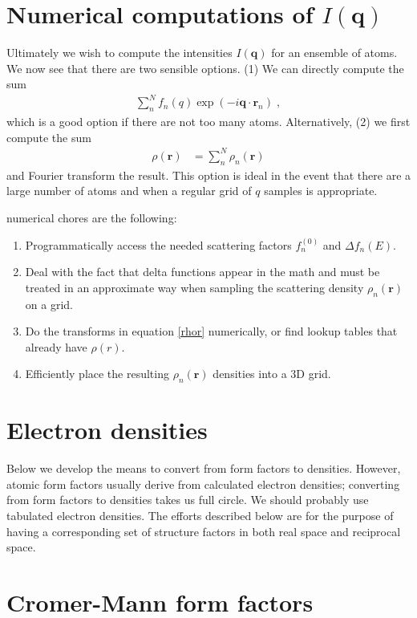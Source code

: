 \documentclass[11pt]{article}
\renewcommand{\vec}[1]{\boldsymbol{#1}}
\begin{document}
\section{Numerical computations of $I(\vec{q})$}

Ultimately we wish to compute the intensities $I(\vec{q})$ for an ensemble of atoms.  We now see that there are two 
sensible options.  (1) We can directly compute the sum
\begin{align}
 \sum_n^N f_n(q) \exp(-i \vec{q}\cdot\vec{r}_n) \;,
\end{align}
which is a good option if there are not too many atoms.  Alternatively, (2) we first compute the sum
\begin{align}
\rho(\vec{r})  &= \sum_n^N \rho_n(\vec{r})
\end{align}
and Fourier transform the result.  This option is ideal in the event that there are a large number of atoms and
when a regular grid of $q$ samples is appropriate.  

numerical chores are the following:
\begin{enumerate}
\item Programmatically access the needed scattering factors $f_n^{(0)}$ and $\Delta f_n(E)$.
\item Deal with the fact that delta functions appear in the math and must be treated in an approximate way when 
sampling the scattering density $\rho_n(\vec{r})$ on a grid.
\item Do the transforms in equation \ref{rhor} numerically, or find lookup tables that already have $\rho(r)$.
\item Efficiently place the resulting $\rho_n(\vec{r})$ densities into a 3D grid.
\end{enumerate}

\section{Electron densities}

Below we develop the means to convert from form factors to densities.  However, atomic form factors usually derive from
calculated electron densities; converting from form factors to densities takes us full circle.  We should probably use
tabulated electron densities\cite{kogaAnalyticalHartreeFockElectron1996}.  The efforts described below
are for the purpose of having a corresponding set of structure factors in both real space and reciprocal
space.

\section{Cromer-Mann form factors}
\end{document}
